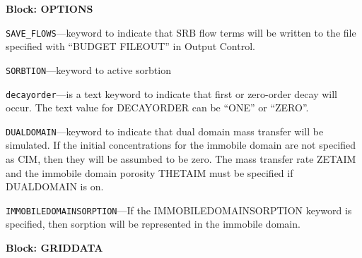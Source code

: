 
\item \textbf{Block: OPTIONS}

\begin{description}
\item \texttt{SAVE\_FLOWS}---keyword to indicate that SRB flow terms will be written to the file specified with ``BUDGET FILEOUT'' in Output Control.

\item \texttt{SORBTION}---keyword to active sorbtion

\item \texttt{decayorder}---is a text keyword to indicate that first or zero-order decay will occur.  The text value for DECAYORDER can be ``ONE'' or ``ZERO''.

\item \texttt{DUALDOMAIN}---keyword to indicate that dual domain mass transfer will be simulated.  If the initial concentrations for the immobile domain are not specified as CIM, then they will be assumbed to be zero.  The mass transfer rate ZETAIM and the immobile domain porosity THETAIM must be specified if DUALDOMAIN is on.

\item \texttt{IMMOBILEDOMAINSORPTION}---If the IMMOBILEDOMAINSORPTION keyword is specified, then sorption will be represented in the immobile domain.

\end{description}
\item \textbf{Block: GRIDDATA}

